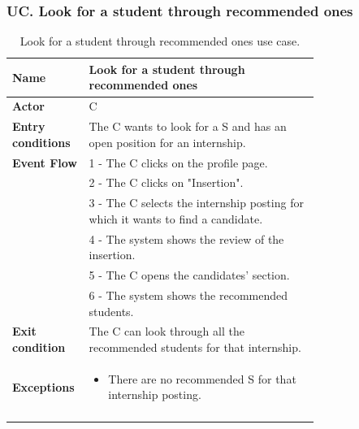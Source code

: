 \subsubsection*{UC\cuc . Look for a student through recommended ones}
\begin{center}
    \begin{longtable}{|l|p{0.75\linewidth}|}
        \hline
        \textbf{Name}               & Look for a student through recommended ones\\
        \hline
        \textbf{Actor}              & C\\
        \hline
        \textbf{Entry conditions}   & The C wants to look for a S and has an open position for an internship.\\
        \hline
        \textbf{Event Flow}         & 1 - The C clicks on the profile page. \\
        & 2 - The C clicks on "Insertion". \\
        & 3 - The C selects the internship posting for which it wants to find a candidate. \\
        & 4 - The system shows the review of the insertion. \\
        & 5 - The C opens the candidates’ section. \\
        & 6 - The system shows the recommended students. \\
        \hline
        \textbf{Exit condition}   & The C can look through all the recommended students for that internship. \\       
        \hline
        \textbf{Exceptions}       & \begin{itemize}
            \item There are no recommended S for that internship posting.
        \end{itemize}\\
        \hline
        \caption{Look for a student through recommended ones use case.}
        \label{tab: look_for_student_use_case}
    \end{longtable}
\end{center}


